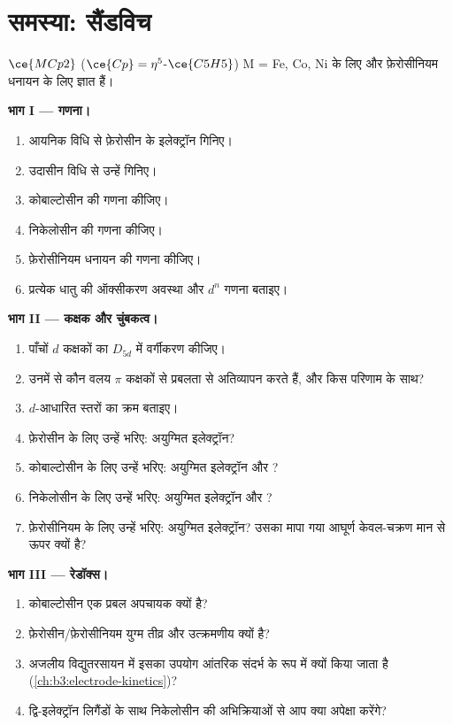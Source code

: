 \section{समस्या: सैंडविच}

\begin{problem}
\label{pb:b3:organometallic-bonding:1}
 $\ce{MCp2}$ ($\ce{Cp} = \eta^5$-$\ce{C5H5}$) M = Fe, Co, Ni के लिए और फ़ेरोसीनियम धनायन के लिए ज्ञात हैं।

\medskip\noindent\textbf{भाग I --- गणना।}
\begin{enumerate}
  \item आयनिक विधि से फ़ेरोसीन के इलेक्ट्रॉन गिनिए।
  \item उदासीन विधि से उन्हें गिनिए।
  \item कोबाल्टोसीन की गणना कीजिए।
  \item निकेलोसीन की गणना कीजिए।
  \item फ़ेरोसीनियम धनायन की गणना कीजिए।
  \item प्रत्येक धातु की ऑक्सीकरण अवस्था और $d^n$ गणना बताइए।
\end{enumerate}

\medskip\noindent\textbf{भाग II --- कक्षक और चुंबकत्व।}
\begin{enumerate}[resume]
  \item पाँचों $d$ कक्षकों का $D_{5d}$ में वर्गीकरण कीजिए।
  \item उनमें से कौन वलय $\pi$ कक्षकों से प्रबलता से अतिव्यापन करते हैं, और किस
        परिणाम के साथ?
  \item $d$-आधारित स्तरों का क्रम बताइए।
  \item फ़ेरोसीन के लिए उन्हें भरिए: अयुग्मित इलेक्ट्रॉन?
  \item कोबाल्टोसीन के लिए उन्हें भरिए: अयुग्मित इलेक्ट्रॉन और ?
  \item निकेलोसीन के लिए उन्हें भरिए: अयुग्मित इलेक्ट्रॉन और ?
  \item फ़ेरोसीनियम के लिए उन्हें भरिए: अयुग्मित इलेक्ट्रॉन? उसका मापा गया आघूर्ण
        केवल-चक्रण मान से ऊपर क्यों है?
\end{enumerate}

\medskip\noindent\textbf{भाग III --- रेडॉक्स।}
\begin{enumerate}[resume]
  \item कोबाल्टोसीन एक प्रबल अपचायक क्यों है?
  \item फ़ेरोसीन/फ़ेरोसीनियम युग्म तीव्र और उत्क्रमणीय क्यों है?
  \item अजलीय विद्युतरसायन में इसका उपयोग आंतरिक संदर्भ के रूप में क्यों किया जाता है
        (\cref{ch:b3:electrode-kinetics})?
  \item द्वि-इलेक्ट्रॉन लिगैंडों के साथ निकेलोसीन की अभिक्रियाओं से आप क्या
        अपेक्षा करेंगे?
\end{enumerate}


\end{problem}
